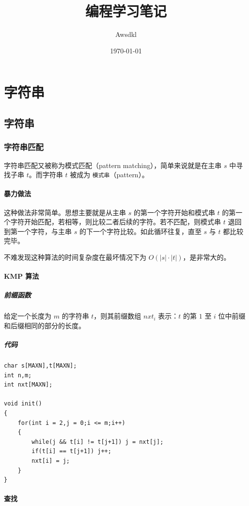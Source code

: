 \documentclass[10pt,twoside,a4paper,UTF8]{ctexbook}
\title{编程学习笔记}
\author{Awsdkl}
\date{\today}
\begin{document}
	\maketitle
	\tableofcontents
	\part{字符串}
	\chapter{字符串}
	\section{字符串匹配}
	字符串匹配又被称为模式匹配（pattern matching），简单来说就是在主串 $s$ 中寻找子串 $t$。而字符串 $t$ 被成为 \texttt{模式串}（pattern）。 \par
	\subsection{暴力做法}
	这种做法非常简单。思想主要就是从主串 $s$ 的第一个字符开始和模式串 $t$ 的第一个字符开始匹配，若相等，则比较二者后续的字符。若不匹配，则模式串 $t$ 退回到第一个字符，与主串 $s$ 的下一个字符比较。如此循环往复，直至 $s$ 与 $t$ 都比较完毕。\par
	不难发现这种算法的时间复杂度在最坏情况下为 $O(|s|\cdot|t|)$，是非常大的。
	\subsection{KMP 算法}
	
	\subsubsection{前缀函数}
	给定一个长度为 $m$ 的字符串 $t$，则其前缀数组 $nxt_i$ 表示：$t$ 的第 $1$ 至 $i$ 位中前缀和后缀相同的部分的长度。
	\subsubsection{代码}
	\begin{lstlisting}
char s[MAXN],t[MAXN];
int n,m;
int nxt[MAXN];

void init()
{
	for(int i = 2,j = 0;i <= m;i++)
	{
		while(j && t[i] != t[j+1]) j = nxt[j];
		if(t[i] == t[j+1]) j++;
		nxt[i] = j;
	}
}
	\end{lstlisting}
	\subsection{查找}
\end{document}
